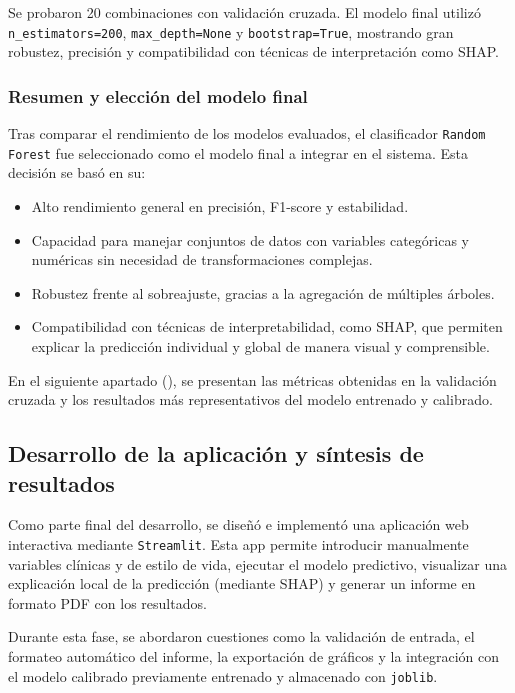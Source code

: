Se probaron 20 combinaciones con validación cruzada. El modelo final utilizó \texttt{n\_estimators=200}, \texttt{max\_depth=None} y \texttt{bootstrap=True}, mostrando gran robustez, precisión y compatibilidad con técnicas de interpretación como SHAP.


\subsubsection{Resumen y elección del modelo final}

Tras comparar el rendimiento de los modelos evaluados, el clasificador \texttt{Random Forest} fue seleccionado como el modelo final a integrar en el sistema. Esta decisión se basó en su:

\begin{itemize}
    \item Alto rendimiento general en precisión, F1-score y estabilidad.
    \item Capacidad para manejar conjuntos de datos con variables categóricas y numéricas sin necesidad de transformaciones complejas.
    \item Robustez frente al sobreajuste, gracias a la agregación de múltiples árboles.
    \item Compatibilidad con técnicas de interpretabilidad, como SHAP, que permiten explicar la predicción individual y global de manera visual y comprensible.
\end{itemize}

En el siguiente apartado (), se presentan las métricas obtenidas en la validación cruzada y los resultados más representativos del modelo entrenado y calibrado.

\subsection{Desarrollo de la aplicación y síntesis de resultados}

Como parte final del desarrollo, se diseñó e implementó una aplicación web interactiva mediante \texttt{Streamlit}. Esta app permite introducir manualmente variables clínicas y de estilo de vida, ejecutar el modelo predictivo, visualizar una explicación local de la predicción (mediante SHAP) y generar un informe en formato PDF con los resultados.

Durante esta fase, se abordaron cuestiones como la validación de entrada, el formateo automático del informe, la exportación de gráficos y la integración con el modelo calibrado previamente entrenado y almacenado con \texttt{joblib}.

